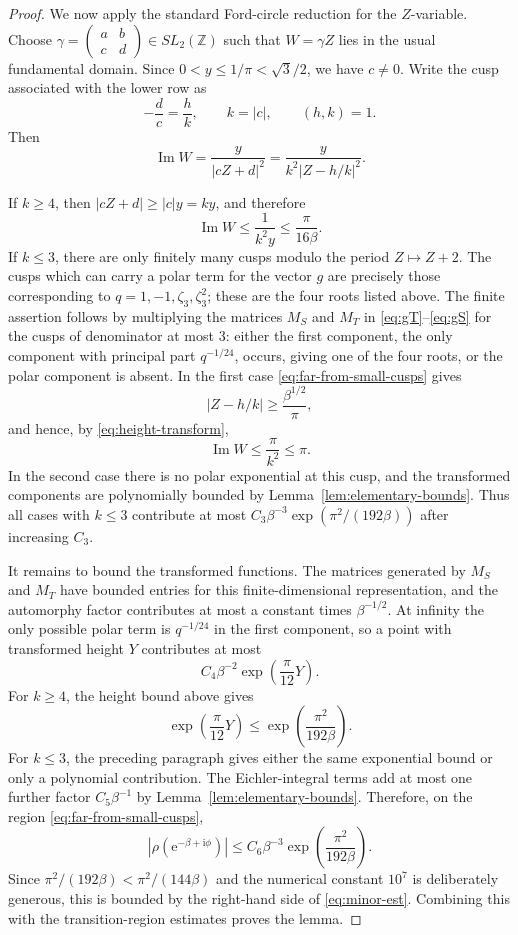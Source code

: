 \documentclass[11pt]{article}
\theoremstyle{remark}
\newcommand{\ii}{\mathrm i}
\newcommand{\e}{\mathrm e}
\newcommand{\Z}{\mathbb Z}
\newcommand{\Impart}{\operatorname{Im}}
\begin{document}
\begin{proof}
We now apply the standard Ford-circle reduction for the $Z$-variable.  Choose
$\gamma=\begin{pmatrix}a&b\\ c&d\end{pmatrix}\in SL_2(\Z)$ such that
$W=\gamma Z$ lies in the usual fundamental domain.  Since $0<y\leq1/\pi<\sqrt3/2$, we have
$c\neq0$.  Write the cusp associated with the lower row as
\[
-\frac{d}{c}=\frac{h}{k},
\qquad k=|c|,
\qquad (h,k)=1.
\]
Then
\begin{equation}\label{eq:height-transform}
\Impart W=\frac{y}{|cZ+d|^2}=\frac{y}{k^2|Z-h/k|^2}.
\end{equation}

If $k\geq4$, then $|cZ+d|\geq |c|y=ky$, and therefore
\[
\Impart W\leq \frac{1}{k^2y}\leq \frac{\pi}{16\beta}.
\]
If $k\leq3$, there are only finitely many cusps modulo the period $Z\mapsto Z+2$.  The cusps
which can carry a polar term for the vector $g$ are precisely those corresponding to
$q=1,-1,\zeta_3,\zeta_3^2$; these are the four roots listed above.  The finite assertion follows
by multiplying the matrices $M_S$ and $M_T$ in \eqref{eq:gT}--\eqref{eq:gS} for the cusps of
denominator at most $3$: either the first component, the only component with principal part
$q^{-1/24}$, occurs, giving one of the four roots, or the polar component is absent.  In the
first case \eqref{eq:far-from-small-cusps} gives
\[
|Z-h/k|\geq \frac{\beta^{1/2}}{\pi},
\]
and hence, by \eqref{eq:height-transform},
\[
\Impart W\leq \frac{\pi}{k^2}\leq\pi.
\]
In the second case there is no polar exponential at this cusp, and the transformed components
are polynomially bounded by Lemma~\ref{lem:elementary-bounds}.  Thus all cases with
$k\leq3$ contribute at most $C_3\beta^{-3}\exp(\pi^2/(192\beta))$ after increasing $C_3$.

It remains to bound the transformed functions.  The matrices generated by $M_S$ and $M_T$
have bounded entries for this finite-dimensional representation, and the automorphy factor
contributes at most a constant times $\beta^{-1/2}$.  At infinity the only possible polar term is
$q^{-1/24}$ in the first component, so a point with transformed height $Y$ contributes at most
\[
C_4\beta^{-2}\exp\left(\frac{\pi}{12}Y\right).
\]
For $k\geq4$, the height bound above gives
\[
\exp\left(\frac{\pi}{12}Y\right)
\leq
\exp\left(\frac{\pi^2}{192\beta}\right).
\]
For $k\leq3$, the preceding paragraph gives either the same exponential bound or only a
polynomial contribution.  The Eichler-integral terms add at most one further factor
$C_5\beta^{-1}$ by Lemma~\ref{lem:elementary-bounds}.  Therefore, on the region
\eqref{eq:far-from-small-cusps},
\[
|\rho(\e^{-\beta+\ii\phi})|
\leq
C_6\beta^{-3}\exp\left(\frac{\pi^2}{192\beta}\right).
\]
Since $\pi^2/(192\beta)<\pi^2/(144\beta)$ and the numerical constant $10^7$ is deliberately
generous, this is bounded by the right-hand side of \eqref{eq:minor-est}.  Combining this with
the transition-region estimates proves the lemma.
\end{proof}
\end{document}
